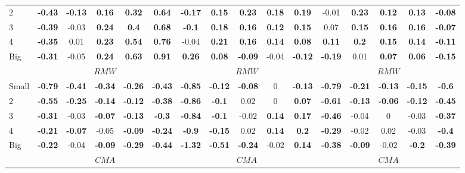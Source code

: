 \begin{table}[H]
\begin{tabular}{lccccc|ccccc|ccccc}
2 & \textbf{-0.43} & \textbf{-0.13} & \textbf{0.16} & \textbf{0.32} & \textbf{0.64} & \textbf{-0.17} & \textbf{0.15} & \textbf{0.23} & \textbf{0.18} & \textbf{0.19} & -0.01 & \textbf{0.23} & \textbf{0.12} & \textbf{0.13} & \textbf{-0.08} \\
3 & \textbf{-0.39} & -0.03 & \textbf{0.24} & \textbf{0.4} & \textbf{0.68} & \textbf{-0.1} & \textbf{0.18} & \textbf{0.16} & \textbf{0.12} & \textbf{0.15} & 0.07 & \textbf{0.15} & \textbf{0.16} & \textbf{0.16} & \textbf{-0.07} \\
4 & \textbf{-0.35} & 0.01 & \textbf{0.23} & \textbf{0.54} & \textbf{0.76} & -0.04 & \textbf{0.21} & \textbf{0.16} & \textbf{0.14} & \textbf{0.08} & \textbf{0.11} & \textbf{0.2} & \textbf{0.15} & \textbf{0.14} & \textbf{-0.11} \\
Big & \textbf{-0.31} & -0.05 & \textbf{0.24} & \textbf{0.63} & \textbf{0.91} & \textbf{0.26} & \textbf{0.08} & \textbf{-0.09} & -0.04 & \textbf{-0.12} & \textbf{-0.19} & 0.01 & \textbf{0.07} & \textbf{0.06} & \textbf{-0.15} \\
 & \multicolumn{5}{c|}{$RMW$} & \multicolumn{5}{c|}{$RMW$} & \multicolumn{5}{c}{$RMW$} \\
Small & \textbf{-0.79} & \textbf{-0.41} & \textbf{-0.34} & \textbf{-0.26} & \textbf{-0.43} & \textbf{-0.85} & \textbf{-0.12} & \textbf{-0.08} & 0 & \textbf{-0.13} & \textbf{-0.79} & \textbf{-0.21} & \textbf{-0.13} & \textbf{-0.15} & \textbf{-0.6} \\
2 & \textbf{-0.55} & \textbf{-0.25} & \textbf{-0.14} & \textbf{-0.12} & \textbf{-0.38} & \textbf{-0.86} & \textbf{-0.1} & 0.02 & 0 & \textbf{0.07} & \textbf{-0.61} & \textbf{-0.13} & \textbf{-0.06} & \textbf{-0.12} & \textbf{-0.45} \\
3 & \textbf{-0.31} & -0.03 & \textbf{-0.07} & \textbf{-0.13} & \textbf{-0.3} & \textbf{-0.84} & \textbf{-0.1} & -0.02 & \textbf{0.14} & \textbf{0.17} & \textbf{-0.46} & -0.04 & 0 & -0.03 & \textbf{-0.37} \\
4 & \textbf{-0.21} & \textbf{-0.07} & -0.05 & \textbf{-0.09} & \textbf{-0.24} & \textbf{-0.9} & \textbf{-0.15} & 0.02 & \textbf{0.14} & \textbf{0.2} & \textbf{-0.29} & -0.02 & 0.02 & -0.03 & \textbf{-0.4} \\
Big & \textbf{-0.22} & -0.04 & \textbf{-0.09} & \textbf{-0.29} & \textbf{-0.44} & \textbf{-1.32} & \textbf{-0.51} & \textbf{-0.24} & -0.02 & \textbf{0.14} & \textbf{-0.38} & \textbf{-0.09} & -0.02 & \textbf{-0.2} & \textbf{-0.39} \\
 & \multicolumn{5}{c|}{$CMA$} & \multicolumn{5}{c|}{$CMA$} & \multicolumn{5}{c}{$CMA$} \\

\end{tabular}
\end{table}
